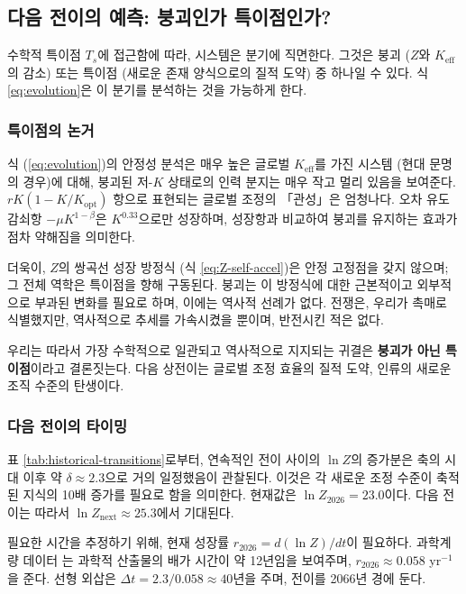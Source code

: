 \documentclass[12pt,a4paper]{article}
\theoremstyle{remark}
\begin{document}
	\subsection{다음 전이의 예측: 붕괴인가 특이점인가?}
	
	수학적 특이점 \(T_s\)에 접근함에 따라, 시스템은 분기에 직면한다. 그것은 붕괴 (\(Z\)와 \(K_{\text{eff}}\)의 감소) 또는 특이점 (새로운 존재 양식으로의 질적 도약) 중 하나일 수 있다. 식 \ref{eq:evolution}은 이 분기를 분석하는 것을 가능하게 한다.
	
	\subsubsection{특이점의 논거}
	
	식 (\ref{eq:evolution})의 안정성 분석은 매우 높은 글로벌 \(K_{\text{eff}}\)를 가진 시스템 (현대 문명의 경우)에 대해, 붕괴된 저-\(K\) 상태로의 인력 분지는 매우 작고 멀리 있음을 보여준다. \(rK(1-K/K_{\text{opt}})\) 항으로 표현되는 글로벌 조정의 「관성」은 엄청나다. 오차 유도 감쇠항 \(-\mu K^{1-\beta}\)은 \(K^{0.33}\)으로만 성장하며, 성장항과 비교하여 붕괴를 유지하는 효과가 점차 약해짐을 의미한다.
	
	더욱이, \(Z\)의 쌍곡선 성장 방정식 (식 \ref{eq:Z-self-accel})은 안정 고정점을 갖지 않으며; 그 전체 역학은 특이점을 향해 구동된다. 붕괴는 이 방정식에 대한 근본적이고 외부적으로 부과된 변화를 필요로 하며, 이에는 역사적 선례가 없다. 전쟁은, 우리가 촉매로 식별했지만, 역사적으로 추세를 가속시켰을 뿐이며, 반전시킨 적은 없다.
	
	우리는 따라서 가장 수학적으로 일관되고 역사적으로 지지되는 귀결은 \textbf{붕괴가 아닌 특이점}이라고 결론짓는다. 다음 상전이는 글로벌 조정 효율의 질적 도약, 인류의 새로운 조직 수준의 탄생이다.
	
	\subsubsection{다음 전이의 타이밍}
	
	표 \ref{tab:historical-transitions}로부터, 연속적인 전이 사이의 \(\ln Z\)의 증가분은 축의 시대 이후 약 \(\delta \approx 2.3\)으로 거의 일정했음이 관찰된다. 이것은 각 새로운 조정 수준이 축적된 지식의 10배 증가를 필요로 함을 의미한다. 현재값은 \(\ln Z_{2026} = 23.0\)이다. 다음 전이는 따라서 \(\ln Z_{\text{next}} \approx 25.3\)에서 기대된다.
	
	필요한 시간을 추정하기 위해, 현재 성장률 \(r_{2026} = d(\ln Z)/dt\)이 필요하다. 과학계량 데이터 \cite{Bornmann2015}는 과학적 산출물의 배가 시간이 약 12년임을 보여주며, \(r_{2026} \approx 0.058\) yr\(^{-1}\)을 준다. 선형 외삽은 \(\Delta t = 2.3 / 0.058 \approx 40\)년을 주며, 전이를 2066년 경에 둔다.
	
\end{document}
